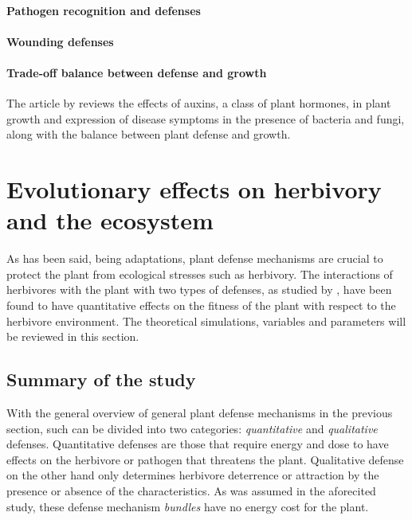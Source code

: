 \paragraph{Pathogen recognition and defenses}

\paragraph{Wounding defenses}

\paragraph{Trade-off balance between defense and growth}
The article by  reviews the effects of auxins, a class of plant hormones, in plant growth and expression of disease symptoms in the presence of bacteria and fungi, along with the balance between plant defense and growth.

\section{Evolutionary effects on herbivory and the ecosystem}
As has been said, being adaptations, plant defense mechanisms are crucial to protect the plant from ecological stresses such as herbivory.
The interactions of herbivores with the plant with two types of defenses, as studied by , have been found to have quantitative effects on the fitness of the plant with respect to the herbivore environment.
The theoretical simulations, variables and parameters will be reviewed in this section.

\subsection{Summary of the study}
With the general overview of general plant defense mechanisms in the previous section, such can be divided into two categories: \emph{quantitative} and \emph{qualitative} defenses.
Quantitative defenses are those that require energy and dose to have effects on the herbivore or pathogen that threatens the plant.
Qualitative defense on the other hand only determines herbivore deterrence or attraction by the presence or absence of the characteristics.
As was assumed in the aforecited study, these defense mechanism \emph{bundles} have no energy cost for the plant.

